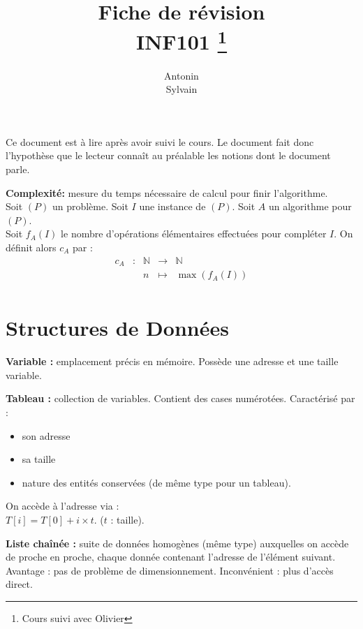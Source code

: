\documentclass[a4paper, 8pt]{article}
\title{\sffamily\textbf{Fiche de révision \\ INF101} \thanks{Cours suivi avec Olivier \bsc{Hudry} }}
\author{Antonin \bsc{Godard}\\Sylvain \bsc{Rager}}
\begin{document}
\renewcommand{\labelitemii}{$\bullet$}

\begin{multicols*}{3}
\setlength{\parindent}{0pt}
\maketitle

\begin{changemargin}{0.5cm}{0.5cm} 
{\footnotesize Ce document est à lire après avoir suivi le cours. Le document fait donc l'hypothèse que le lecteur connaît au préalable les notions dont le document parle.}
\end{changemargin}


\textbf{Complexité:} mesure du temps nécessaire de calcul pour finir l'algorithme.\\ Soit $(P)$ un problème. Soit $I$ une instance de $(P)$. Soit $A$ un algorithme pour $(P)$.\\ Soit $f_A(I)$ le nombre d'opérations élémentaires effectuées pour compléter $I$. On définit alors $c_A$ par :
\[
\begin{array}{cc|ccl}
c_A & : & \mathbb{N} & \to & \mathbb{N} \\
 & & n & \mapsto & \max(f_A(I)) \\
\end{array}
\]

\section*{Structures de Données}

\textbf{Variable :} emplacement précis en mémoire. Possède une adresse et une taille variable.

\textbf{Tableau :} collection de variables. Contient des cases numérotées. Caractérisé par :\begin{itemize}
\item son adresse
\item sa taille
\item nature des entités conservées (de même type pour un tableau).
\end{itemize}
On accède à l'adresse via :\\ $ T\left[ i\right] = T\left[ 0\right] + i\times t $. ($t$ : taille).

\textbf{Liste chaînée :} suite de données homogènes (même type) auxquelles on accède de proche en proche, chaque donnée contenant l'adresse de l'élément suivant. Avantage : pas de problème de dimensionnement. Inconvénient : plus d'accès direct.


\end{multicols*}
\end{document}
